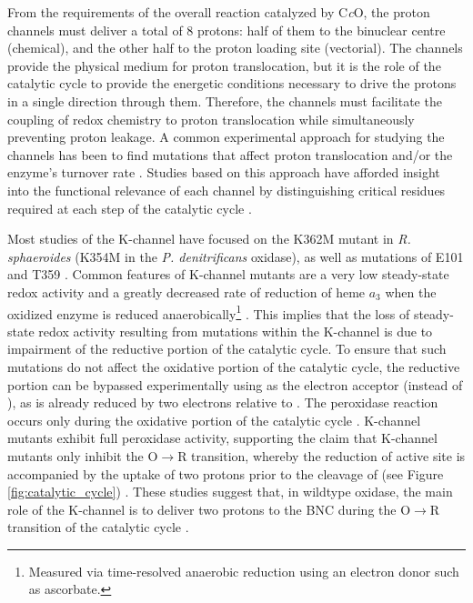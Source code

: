 From the requirements of the overall reaction catalyzed by C\emph{c}O, the proton channels must deliver a total of 8 protons: half of them to the binuclear centre (chemical), and the other half to the proton loading site (vectorial). The channels provide the physical medium for proton translocation, but it is the role of the catalytic cycle to provide the energetic conditions necessary to drive the protons in a single direction through them. Therefore, the channels must facilitate the coupling of redox chemistry to proton translocation while simultaneously preventing proton leakage. A common experimental approach for studying the channels has been to find mutations that affect proton translocation and/or the enzyme's turnover rate \cite{Konstantinov:1997p5292,Zaslavsky:1998p10317,Mills:2000p4585,Ganesan:2010p8417}. Studies based on this approach have afforded insight into the functional relevance of each channel by distinguishing critical residues required at each step of the catalytic cycle \cite{Konstantinov:1997p5292}.

Most studies of the K-channel have focused on the K362M mutant in \emph{R. sphaeroides} (K354M in the \emph{P. denitrificans} oxidase), as well as mutations of E101 and T359 \cite{Zaslavsky:1998p10317,Pfitzner:1998p10266,Ruitenberg:2000p10226,Mills:2000p4585,Ganesan:2010p8417}. Common features of K-channel mutants are a very low steady-state redox activity and a greatly decreased rate of reduction of heme $a_3$ when the oxidized enzyme is reduced anaerobically\footnote{Measured via time-resolved anaerobic reduction using an electron donor such as ascorbate.} \cite{Ganesan:2010p8417}. This implies that the loss of steady-state redox activity resulting from mutations within the K-channel is due to impairment of the reductive portion of the catalytic cycle. To ensure that such mutations do not affect the oxidative portion of the catalytic cycle, the reductive portion can be bypassed experimentally using  as the electron acceptor (instead of ), as  is already reduced by two electrons relative to  \cite{Zaslavsky:1998p10317}. The peroxidase reaction occurs only during the oxidative portion of the catalytic cycle \cite{Zaslavsky:1998p10317}. K-channel mutants exhibit full peroxidase activity, supporting the claim that K-channel mutants only inhibit the O$\rightarrow$R transition, whereby the reduction of active site is accompanied by the uptake of two protons prior to the cleavage of  (see Figure \ref{fig:catalytic_cycle}) \cite{Zaslavsky:1998p10317}. These studies suggest that, in wildtype oxidase, the main role of the K-channel is to deliver two protons to the BNC during the O$\rightarrow$R transition of the catalytic cycle \cite{Ganesan:2010p8417}.


